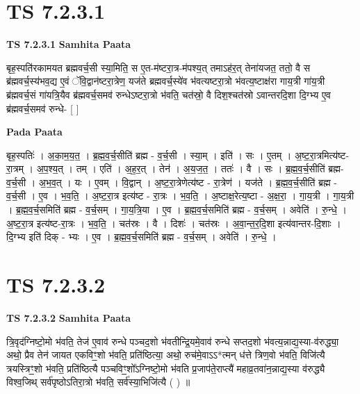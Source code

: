 \documentclass[17pt]{extarticle}
\begin{document}
\section*{ TS 7.2.3.1 }

\textbf{TS 7.2.3.1 } \newline
\textbf{Samhita Paata} \newline

बृह॒स्पति॑रकामयत ब्रह्मवर्च॒सी स्या॒मिति॒ स ए॒त-म॑ष्टरा॒त्र-म॑पश्य॒त् तमाऽह॑र॒त् तेना॑यजत॒ ततो॒ वै स ब्र॑ह्मवर्च॒स्य॑भव॒द्य ए॒वं ॅवि॒द्वान॑ष्टरा॒त्रेण॒ यज॑ते ब्रह्मवर्च॒स्ये॑व भ॑वत्यष्टरा॒त्रो भ॑वत्य॒ष्टाक्ष॑रा गाय॒त्री गा॑य॒त्री ब्र॑ह्मवर्च॒सं गा॑यत्रि॒यैव ब्र॑ह्मवर्च॒समव॑ रुन्धेऽष्टरा॒त्रो भ॑वति॒ चत॑स्रो॒ वै दिश॒श्चत॑स्रो ऽवान्तरदि॒शा दि॒ग्भ्य ए॒व ब्र॑ह्मवर्च॒समव॑ रुन्धे- [  ] \newline

\textbf{Pada Paata} \newline

बृह॒स्पतिः॑ । अ॒का॒म॒य॒त॒ । ब्र॒ह्म॒व॒र्च॒सीति॑ ब्रह्म - व॒र्च॒सी । स्या॒म् । इति॑ । सः । ए॒तम् । अ॒ष्ट॒रा॒त्रमित्य॑ष्ट-रा॒त्रम् । अ॒प॒श्य॒त् । तम् । एति॑ । अ॒ह॒र॒त् । तेन॑ । अ॒य॒ज॒त॒ । ततः॑ । वै । सः । ब्र॒ह्म॒व॒र्च॒सीति॑ ब्रह्म-व॒र्च॒सी । अ॒भ॒व॒त् । यः । ए॒वम् । वि॒द्वान् । अ॒ष्ट॒रा॒त्रेणेत्य॑ष्ट - रा॒त्रेण॑ । यज॑ते । ब्र॒ह्म॒व॒र्च॒सीति॑ ब्रह्म - व॒र्च॒सी । ए॒व । भ॒व॒ति॒ । अ॒ष्ट॒रा॒त्र इत्य॑ष्ट - रा॒त्रः । भ॒व॒ति॒ । अ॒ष्टाक्ष॒रेत्य॒ष्टा - अ॒क्ष॒रा॒ । गा॒य॒त्री । गा॒य॒त्री । ब्र॒ह्म॒व॒र्च॒समिति॑ ब्रह्म - व॒र्च॒सम् । गा॒य॒त्रि॒या । ए॒व । ब्र॒ह्म॒व॒र्च॒समिति॑ ब्रह्म - व॒र्च॒सम् । अवेति॑ । रु॒न्धे॒ । अ॒ष्ट॒रा॒त्र इत्य॑ष्ट-रा॒त्रः । भ॒व॒ति॒ । चत॑स्रः । वै । दिशः॑ । चत॑स्रः । अ॒वा॒न्त॒र॒दि॒शा इत्य॑वान्तर-दि॒शाः । दि॒ग्भ्य इति॑ दिक् - भ्यः । ए॒व । ब्र॒ह्म॒व॒र्च॒समिति॑ ब्रह्म - व॒र्च॒सम् । अवेति॑ । रु॒न्धे॒ ।  \newline




\section*{ TS 7.2.3.2 }

\textbf{TS 7.2.3.2 } \newline
\textbf{Samhita Paata} \newline

त्रि॒वृद॑ग्निष्टो॒मो भ॑वति॒ तेज॑ ए॒वाव॑ रुन्धे पञ्चद॒शो भ॑वतीन्द्रि॒यमे॒वाव॑ रुन्धे सप्तद॒शो भ॑वत्य॒न्नाद्य॒स्या-व॑रुद्ध्या॒ अथो॒ प्रैव तेन॑ जायत एकविꣳ॒॒शो भ॑वति॒ प्रति॑ष्ठित्या॒ अथो॒ रुच॑मे॒वाऽऽ*त्मन् ध॑त्ते त्रिण॒वो भ॑वति॒ विजि॑त्यै त्रयस्त्रिꣳ॒॒शो भ॑वति॒ प्रति॑ष्ठित्यै पञ्चविꣳ॒॒शो᳚ऽग्निष्टो॒मो भ॑वति प्र॒जाप॑ते॒राप्त्यै॑ महाव्र॒तवा॑न॒न्नाद्य॒स्या व॑रुद्ध्यै विश्व॒जिथ् सर्व॑पृष्ठोऽतिरा॒त्रो भ॑वति॒ सर्व॑स्या॒भिजि॑त्यै ( ) ॥ \newline
\end{document}
